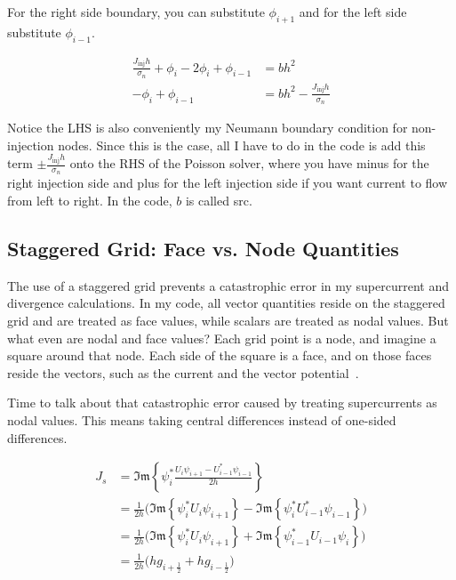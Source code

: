 \documentclass[11pt]{article}
\theoremstyle{definition}
\renewcommand{\Im}{\mathfrak{Im}}
\begin{document}
For the right side boundary, you can substitute $\phi_{i+1}$ and for the left side substitute $\phi_{i-1}$.

\begin{align}
\frac{J_{\mathrm{inj}} h}{\sigma_n} + \phi_i - 2 \phi_i + \phi_{i-1} &= b h^2 \label{eq:ci-sub-1}\\
-\phi_i + \phi_{i-1} &= b h^2 - \frac{J_{\mathrm{inj}} h}{\sigma_n} \label{eq:ci-sub-2}
\end{align}

Notice the LHS is also conveniently my Neumann boundary condition for non-injection nodes. Since this is the case, all I have to do in the code is add this term $\pm \frac{J_{\mathrm{inj}} h}{\sigma_n}$ onto the RHS of the Poisson solver, where you have minus for the right injection side and plus for the left injection side if you want current to flow from left to right. In the code, $b$ is called src.

\subsection{Staggered Grid: Face vs. Node Quantities}
\label{sec:staggered-grid}

The use of a staggered grid prevents a catastrophic error in my supercurrent and divergence calculations. In my code, all vector quantities reside on the staggered grid and are treated as face values, while scalars are treated as nodal values. But what even are nodal and face values? Each grid point is a node, and imagine a square around that node. Each side of the square is a face, and on those faces reside the vectors, such as the current and the vector potential~\cite{kao2025, coskun1997}.

Time to talk about that catastrophic error caused by treating supercurrents as nodal values. This means taking central differences instead of one-sided differences.

\begin{align}
J_s &= \Im\!\left\{ \psi^*_i \frac{U_i \psi_{i+1} - U^*_{i-1} \psi_{i-1}}{2h} \right\} \label{eq:node-1}\\
&= \frac{1}{2h} \big( \Im\!\left\{ \psi_i^* U_i \psi_{i+1} \right\} - \Im\!\left\{ \psi_i^* U^*_{i-1} \psi_{i-1} \right\} \big) \label{eq:node-2}\\
&= \frac{1}{2h} \big( \Im\!\left\{ \psi_i^* U_i \psi_{i+1} \right\} + \Im\!\left\{ \psi_{i-1}^* U_{i-1} \psi_i \right\} \big) \label{eq:node-3}\\
&= \frac{1}{2h} \big( h g_{i+\frac{1}{2}} + h g_{i-\frac{1}{2}} \big) \label{eq:node-4}
\end{align}
\end{document}
